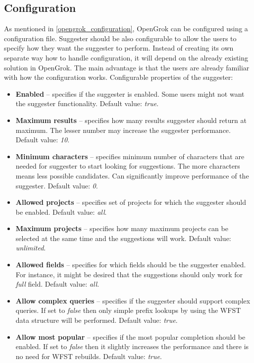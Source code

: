 \subsection{Configuration}
As mentioned in \ref{opengrok_configuration}, OpenGrok can be configured using a configuration file.
Suggester should be also configurable to allow the users to specify how they want the suggester to perform.
Instead of creating its own separate way how to handle configuration, it will depend on the already existing solution in
OpenGrok. The main advantage is that the users are already familiar with how the configuration works. Configurable
properties of the suggester:
\begin{itemize}
    \item \textbf{Enabled} – specifies if the suggester is enabled. Some users might not want the suggester functionality.
    Default value: \textit{true}.
    \item \textbf{Maximum results} – specifies how many results suggester should return at maximum. The lesser number may
    increase the suggester performance. Default value: \textit{10}.
    \item \textbf{Minimum characters} – specifies minimum number of characters that are needed for suggester to start looking
    for suggestions. The more characters means less possible candidates. Can significantly improve performance of the
    suggester. Default value: \textit{0}.
    \item \textbf{Allowed projects} – specifies set of projects for which the suggester should be enabled. Default value: \textit{all}.
    \item \textbf{Maximum projects} – specifies how many maximum projects can be selected at the same time and the suggestions will work.
    Default value: \textit{unlimited}.
    \item \textbf{Allowed fields} – specifies for which fields should be the suggester enabled. For instance, it might be
    desired that the suggestions should only work for \textit{full} field. Default value: \textit{all}.
    \item \textbf{Allow complex queries} – specifies if the suggester should support complex queries. If set to
    \textit{false} then only simple prefix lookups by using the WFST data structure will be performed. Default value:
    \textit{true}.
    \item \textbf{Allow most popular} – specifies if the most popular completion should be enabled.
    If set to \textit{false} then it slightly increases the performance and there is no need for WFST rebuilds. Default value: \textit{true}.

\end{itemize}
